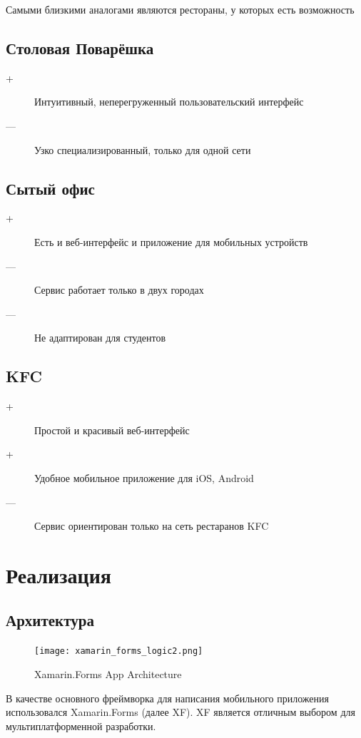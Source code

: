 \documentclass[14pt]{matmex-diploma-custom}
\begin{document}
    Самыми близкими аналогами являются рестораны, у которых есть возможность
    \subsection{Столовая Поварёшка}
    \begin{description}
        \item[+] Интуитивный, неперегруженный пользовательский интерфейс
        \item[—] Узко специализированный, только для одной сети
    \end{description}
	\subsection{Сытый офис}
	\begin{description}
        \item[+] Есть и веб-интерфейс и приложение для мобильных устройств
        \item[—] Сервис работает только в двух городах
        \item[—] Не адаптирован для студентов
    \end{description}
    \subsection{KFC}
	\begin{description}
        \item[+] Простой и красивый веб-интерфейс
        \item[+] Удобное мобильное приложение для iOS, Android
        \item[—] Сервис ориентирован только на сеть рестаранов KFC
    \end{description}

\section{Реализация}
    \subsection{Архитектура}
        \begin{figure}
            \centering
            \texttt{[image: xamarin\_forms\_logic2.png]}
            \caption{Xamarin.Forms App Architecture}
        \end{figure}
        В качестве основного фреймворка для написания мобильного приложения использовался Xamarin.Forms (далее XF).
        XF является отличным выбором для мультиплатформенной разработки.
\end{document}

